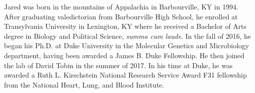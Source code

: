 \documentclass[PhD]{dukethesis2006}
\begin{document}
\begin{doublespace}

Jared was born in the mountains of Appalachia in Barbourville, KY in 1994. After graduating valedictorian from Barbourville High School, he enrolled at Transylvania University in Lexington, KY where he received a Bachelor of Arts degree in Biology and Political Science, \textit{summa cum laude}. In the fall of 2016, he began his Ph.D. at Duke University in the Molecular Genetics and Microbiology department, having been awarded a James B. Duke Fellowship. He then joined the lab of David Tobin in the summer of 2017. In his time at Duke, he was awarded a Ruth L. Kirschstein National Research Service Award F31 fellowship from the National Heart, Lung, and Blood Institute.

\end{doublespace}
\end{document}
